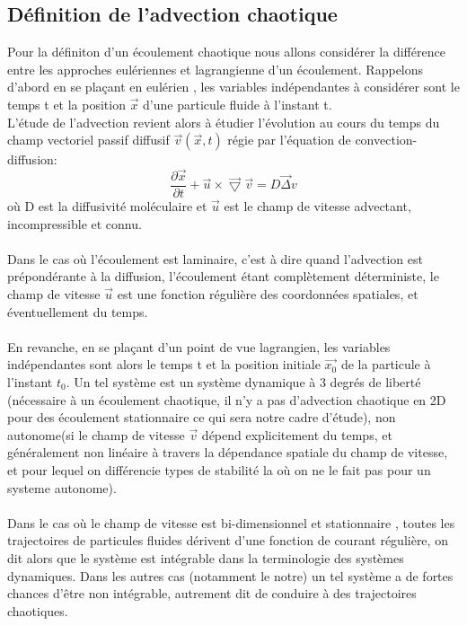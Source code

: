 \documentclass[a4paper,12pt,titlepage]{report}
\begin{document}
\subsection{Définition de l'advection chaotique}
Pour la définiton d'un écoulement chaotique nous allons considérer la différence entre les approches eulériennes et lagrangienne d'un écoulement. 
 Rappelons  d'abord en se plaçant en eulérien , les variables indépendantes à considérer sont le temps t et la position $\vec{x}$ d'une particule fluide à l'instant t. \\
 L'étude de l'advection revient alors à étudier l'évolution au cours du temps du champ vectoriel passif diffusif $\vec{v}(\vec{x},t)$ régie par l'équation de convection-diffusion: 
 \[
 \frac{\partial \vec{x}}{\partial t} + \vec{u} \times \vec{\bigtriangledown}\vec{v}= D \vec{\Delta} v
\]
où D est la diffusivité moléculaire et $\vec{u}$ est le champ de vitesse advectant, incompressible et connu. \\
\\
Dans le cas où l'écoulement est laminaire, c'est à dire quand l'advection est prépondérante à la diffusion, l'écoulement étant complètement déterministe, le champ de vitesse $\vec{u}$ est une fonction régulière des coordonnées spatiales, et éventuellement du temps. 
\\ 
\\
En revanche, en se plaçant d'un point de vue lagrangien, les variables indépendantes sont alors le temps t et la position initiale $\vec{x_0}$ de la particule à l'instant $t_0$. Un tel système est un système dynamique à 3 degrés de liberté (nécessaire à un écoulement chaotique, il n'y a pas d'advection chaotique en 2D pour des écoulement stationnaire ce qui sera notre cadre d'étude), non autonome(si le champ de vitesse $\vec{v}$ dépend explicitement du temps, et généralement non linéaire à travers la dépendance spatiale du champ de vitesse, et pour lequel on différencie types de stabilité la où on ne le fait pas pour un systeme autonome). \\
\\
Dans le cas où le champ de vitesse est bi-dimensionnel et stationnaire , toutes les trajectoires de particules  fluides dérivent d'une fonction de courant régulière, on dit alors que le système est intégrable dans la terminologie des systèmes dynamiques. 
Dans les autres cas (notamment le notre) un tel système a de fortes chances d'être non intégrable, autrement dit de conduire à des trajectoires chaotiques. 
\\
\end{document}
